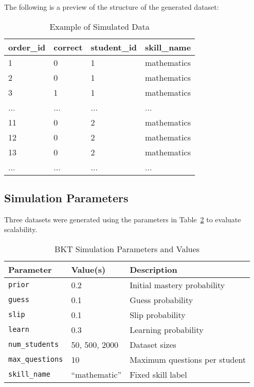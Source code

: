 \documentclass{article}
\begin{document}
The following is a preview of the structure of the generated dataset:

\begin{table}[ht]
\centering
\caption{Example of Simulated Data}
\label{tab:example-data}
\begin{tabular}{|l|l|l|l|}
\hline
\textbf{order\_id} & \textbf{correct} & \textbf{student\_id} & \textbf{skill\_name} \\ \hline
1 & 0 & 1 & mathematics \\ \hline
2 & 0 & 1 & mathematics \\ \hline
3 & 1 & 1 & mathematics \\ \hline
... & ... & ... & ... \\ \hline
11 & 0 & 2 & mathematics \\ \hline
12 & 0 & 2 & mathematics \\ \hline
13 & 0 & 2 & mathematics \\ \hline
... & ... & ... & ... \\ \hline
\end{tabular}
\end{table}

\subsection{Simulation Parameters}
Three datasets were generated using the parameters in Table~\ref{tab:sim_params} to evaluate scalability.

\begin{table}[H]
\centering
\caption{BKT Simulation Parameters and Values}
\label{tab:sim_params}
\begin{tabular}{@{}lll@{}}
\toprule
\textbf{Parameter} & \textbf{Value(s)} & \textbf{Description} \\
\midrule
\texttt{prior} & 0.2 & Initial mastery probability \\
\texttt{guess} & 0.1 & Guess probability \\
\texttt{slip} & 0.1 & Slip probability \\
\texttt{learn} & 0.3 & Learning probability \\
\texttt{num\_students} & 50, 500, 2000 & Dataset sizes \\
\texttt{max\_questions} & 10 & Maximum questions per student \\
\texttt{skill\_name} & ``mathematic'' & Fixed skill label \\
\bottomrule
\end{tabular}
\end{table}
\end{document}
